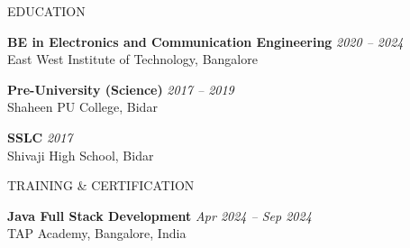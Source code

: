 \documentclass{resume}
\begin{document}

\begin{rSection}{EDUCATION}

\textbf{BE in Electronics and Communication Engineering}
\hfill \textit{2020 -- 2024} \\
East West Institute of Technology, Bangalore

\textbf{Pre-University (Science)}
\hfill \textit{2017 -- 2019} \\
Shaheen PU College, Bidar

\textbf{SSLC}
\hfill \textit{2017} \\
Shivaji High School, Bidar

\end{rSection}


\begin{rSection}{TRAINING \& CERTIFICATION}

\textbf{Java Full Stack Development}
\hfill \textit{Apr 2024 -- Sep 2024} \\
TAP Academy, Bangalore, India

\end{rSection}
\end{document}
